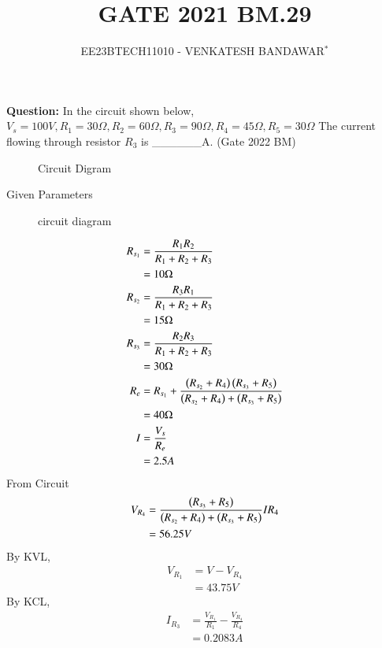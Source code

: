 \documentclass[journal,12pt,twocolumn]{IEEEtran}
\theoremstyle{remark}
\begin{document}

\vspace{3cm}

\title{GATE 2021 BM.29}
\author{EE23BTECH11010 - VENKATESH BANDAWAR$^{*}$%
}
\maketitle
\newpage
\bigskip
\textbf{Question:} In the circuit shown below, $V_s =100V, R_1 =30\Omega, R_2 =60\Omega, R_3 =90\Omega, R_4 =45\Omega, R_5 =30\Omega$ The current flowing through resistor $R_3$ is \_\_\_\_\_\_A.  \hfill(Gate 2022 BM) \\
\begin{figure}[!ht]
    \centering
    
    \caption{Circuit Digram}
    \label{given diagram_2022_bm_29}
\end{figure}

\solution
\begin{table}[!h]
    \centering
    
    \caption{Given Parameters}
    \label{Given Parameters_2022_bm_29}
\end{table}
\begin{figure}[!h]
    \centering
    
    \caption{circuit diagram}
    \label{star_delta_2022_bm_29}
\end{figure}
\begin{align}
    R_{s_1} &= \frac{R_1 R_2}{R_1 + R_2 + R_3}\\
    &= 10\Omega\\
    R_{s_2} &= \frac{R_3 R_1}{R_1 + R_2 + R_3}\\
    &= 15\Omega\\
    R_{s_3} &= \frac{R_2 R_3}{R_1 + R_2 + R_3}\\
    &= 30\Omega\\
    R_{e} &= R_{s_1} + \frac{\left(R_{s_2} + R_4\right) \left(R_{s_3} + R_5\right)}{\left(R_{s_2} + R_4\right)+\left(R_{s_3} + R_5\right)}\\
    &= 40\Omega\\
    I &= \frac{V_s}{R_e}\\
    &= 2.5A
\end{align}
From Circuit 
\begin{align}
    V_{R_4} &= \frac{\left(R_{s_3} + R_5\right)}{\left(R_{s_2} + R_4\right)+\left(R_{s_3} + R_5\right)} I R_4\\
    &= 56.25 V
\end{align}
By KVL, 
\begin{align}
    V_{R_1} &= V - V_{R_4}\\
    &= 43.75 V
\end{align}
By KCL,
\begin{align}
    I_{R_3} &= \frac{V_{R_1}}{R_1} - \frac{V_{R_4}}{R_4}\\
    &= 0.2083 A
\end{align}
\end{document}
